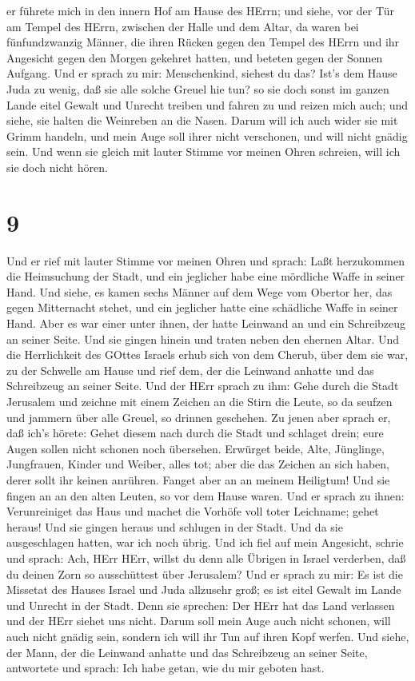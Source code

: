 er führete mich in den innern Hof am Hause des HErrn; und siehe, vor der
Tür am Tempel des HErrn, zwischen der Halle und dem Altar, da waren bei
fünfundzwanzig Männer, die ihren Rücken gegen den Tempel des HErrn und
ihr Angesicht gegen den Morgen gekehret hatten, und beteten gegen der
Sonnen Aufgang.  Und er sprach zu mir: Menschenkind,
siehest du das? Ist's dem Hause Juda zu wenig, daß sie alle solche
Greuel hie tun? so sie doch sonst im ganzen Lande eitel Gewalt und
Unrecht treiben und fahren zu und reizen mich auch; und siehe, sie
halten die Weinreben an die Nasen.  Darum will ich auch
wider sie mit Grimm handeln, und mein Auge soll ihrer nicht verschonen,
und will nicht gnädig sein. Und wenn sie gleich mit lauter Stimme vor
meinen Ohren schreien, will ich sie doch nicht hören.

\hypertarget{section-8}{%
\section{9}\label{section-8}}

 Und er rief mit lauter Stimme vor meinen Ohren und sprach:
Laßt herzukommen die Heimsuchung der Stadt, und ein jeglicher habe eine
mördliche Waffe in seiner Hand.  Und siehe, es kamen sechs
Männer auf dem Wege vom Obertor her, das gegen Mitternacht stehet, und
ein jeglicher hatte eine schädliche Waffe in seiner Hand. Aber es war
einer unter ihnen, der hatte Leinwand an und ein Schreibzeug an seiner
Seite. Und sie gingen hinein und traten neben den ehernen Altar.
 Und die Herrlichkeit des GOttes Israels erhub sich von dem
Cherub, über dem sie war, zu der Schwelle am Hause und rief dem, der die
Leinwand anhatte und das Schreibzeug an seiner Seite.  Und
der HErr sprach zu ihm: Gehe durch die Stadt Jerusalem und zeichne mit
einem Zeichen an die Stirn die Leute, so da seufzen und jammern über
alle Greuel, so drinnen geschehen.  Zu jenen aber sprach er,
daß ich's hörete: Gehet diesem nach durch die Stadt und schlaget drein;
eure Augen sollen nicht schonen noch übersehen.  Erwürget
beide, Alte, Jünglinge, Jungfrauen, Kinder und Weiber, alles tot; aber
die das Zeichen an sich haben, derer sollt ihr keinen anrühren. Fanget
aber an an meinem Heiligtum! Und sie fingen an an den alten Leuten, so
vor dem Hause waren.  Und er sprach zu ihnen: Verunreiniget
das Haus und machet die Vorhöfe voll toter Leichname; gehet heraus! Und
sie gingen heraus und schlugen in der Stadt.  Und da sie
ausgeschlagen hatten, war ich noch übrig. Und ich fiel auf mein
Angesicht, schrie und sprach: Ach, HErr HErr, willst du denn alle
Übrigen in Israel verderben, daß du deinen Zorn so ausschüttest über
Jerusalem?  Und er sprach zu mir: Es ist die Missetat des
Hauses Israel und Juda allzusehr groß; es ist eitel Gewalt im Lande und
Unrecht in der Stadt. Denn sie sprechen: Der HErr hat das Land verlassen
und der HErr siehet uns nicht.  Darum soll mein Auge auch
nicht schonen, will auch nicht gnädig sein, sondern ich will ihr Tun auf
ihren Kopf werfen.  Und siehe, der Mann, der die Leinwand
anhatte und das Schreibzeug an seiner Seite, antwortete und sprach: Ich
habe getan, wie du mir geboten hast.

